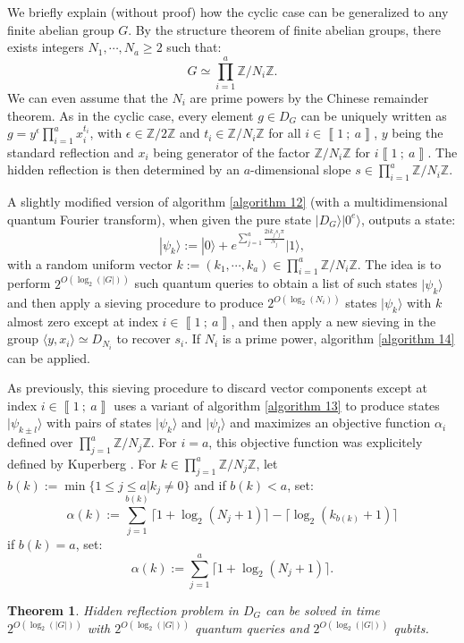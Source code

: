 \documentclass[a4paper,10pt]{report}
\theoremstyle{definition}
\theoremstyle{plain}
\newtheorem{Theorem}[Definition]{Theorem}
\theoremstyle{definition}
\newcommand{\Z}{\mathbb{Z}}
\renewcommand{\i}[2]{\left\llbracket #1~;~#2\right\rrbracket}
\renewcommand{\(}{\left(}
\renewcommand{\)}{\right)}
\begin{document}
We briefly explain (without proof) how the cyclic case can be generalized to any finite abelian group $G$. By the structure theorem of finite abelian groups, there exists integers $N_1,\cdots,N_a\geq 2$ such that:
\[G\simeq\prod_{i=1}^a \Z/N_i\Z.\]
We can even assume that the $N_i$ are prime powers by the Chinese remainder theorem. As in the cyclic case, every element $g\in D_G$ can be uniquely written as $g=y^\epsilon \prod_{i=1}^a x_i^{t_i}$, with $\epsilon\in\Z/2\Z$ and $t_i\in\Z/N_i\Z$ for all $i\in\i{1}{a}$, $y$ being the standard reflection and $x_i$ being generator of the factor $\Z/N_i\Z$ for $i\i{1}{a}$. The hidden reflection is then determined by an $a$-dimensional slope $s\in\prod_{i=1}^a \Z/N_i\Z$.

A slightly modified version of algorithm \ref{algorithm 12} (with a multidimensional quantum Fourier transform), when given the pure state $|D_G\rangle|0^e\rangle$, outputs a state:
\[|\psi_k\rangle:=|0\rangle +e^{\sum_{j=1}^a \frac{2ik_js_j\pi}{N_j}}|1\rangle,\]
with a random uniform vector $k:=(k_1, \cdots, k_a)\in\prod_{i=1}^a \Z/N_i\Z$. The idea is to perform $2^{O(\log_2(|G|))}$ such quantum queries to obtain a list of such states $|\psi_k\rangle$ and then apply a sieving procedure to produce $2^{O(\log_2(N_i))}$ states $|\psi_k\rangle$ with $k$ almost zero except at index $i\in\i{1}{a}$, and then apply a new sieving in the group $\langle y, x_i\rangle\simeq D_{N_i}$ to recover $s_i$.  If $N_i$ is a prime power, algorithm \ref{algorithm 14} can be applied.

As previously, this sieving procedure to discard vector components except at index $i\in\i{1}{a}$ uses a variant of algorithm \ref{algorithm 13} to produce states $|\psi_{k\pm l}\rangle$ with pairs of states $|\psi_k\rangle$ and $|\psi_l\rangle$ and maximizes an objective function $\alpha_i$ defined over $\prod_{j=1}^a \Z/N_j\Z$. For $i=a$, this objective function was explicitely defined by Kuperberg \cite[proof of Theorem 7.1]{Kuperberg}. For $k\in\prod_{j=1}^a \Z/N_j\Z$, let $b(k):=\min\{1\leq j\leq a| k_j\neq 0\}$ and if $b(k)<a$, set:
\[\alpha(k):=\sum_{j=1}^{b(k)}\lceil 1+\log_2(N_j+1)\rceil -\lceil\log_2(k_{b(k)}+1)\rceil\]
if $b(k)=a$, set:
\[\alpha(k):=\sum_{j=1}^{a}\lceil 1+\log_2(N_j+1)\rceil.\]

\begin{Theorem}
Hidden reflection problem in $D_G$ can be solved in time $2^{O(\log_2(|G|))}$ with $2^{O(\log_2(|G|))}$ quantum queries and $2^{O(\log_2(|G|))}$ qubits.
\end{Theorem}
\end{document}
